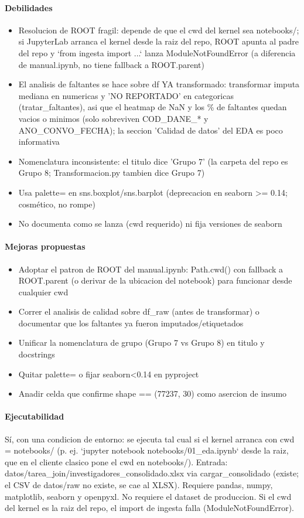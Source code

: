 \paragraph{Debilidades}
\begin{itemize}
  \item Resolucion de ROOT fragil: depende de que el cwd del kernel sea notebooks/; si JupyterLab arranca el kernel desde la raiz del repo, ROOT apunta al padre del repo y `from ingesta import ...` lanza ModuleNotFoundError (a diferencia de manual.ipynb, no tiene fallback a ROOT.parent)
  \item El analisis de faltantes se hace sobre df YA transformado: transformar imputa mediana en numericas y 'NO REPORTADO' en categoricas (tratar\_faltantes), asi que el heatmap de NaN y los \% de faltantes quedan vacios o minimos (solo sobreviven COD\_DANE\_* y ANO\_CONVO\_FECHA); la seccion 'Calidad de datos' del EDA es poco informativa
  \item Nomenclatura inconsistente: el titulo dice 'Grupo 7' (la carpeta del repo es Grupo 8; Transformacion.py tambien dice Grupo 7)
  \item Usa palette= en sns.boxplot/sns.barplot (deprecacion en seaborn >= 0.14; cosmético, no rompe)
  \item No documenta como se lanza (cwd requerido) ni fija versiones de seaborn
\end{itemize}

\paragraph{Mejoras propuestas}
\begin{itemize}
  \item Adoptar el patron de ROOT del manual.ipynb: Path.cwd() con fallback a ROOT.parent (o derivar de la ubicacion del notebook) para funcionar desde cualquier cwd
  \item Correr el analisis de calidad sobre df\_raw (antes de transformar) o documentar que los faltantes ya fueron imputados/etiquetados
  \item Unificar la nomenclatura de grupo (Grupo 7 vs Grupo 8) en titulo y docstrings
  \item Quitar palette= o fijar seaborn<0.14 en pyproject
  \item Anadir celda que confirme shape == (77237, 30) como asercion de insumo
\end{itemize}

\paragraph{Ejecutabilidad}
Sí, con una condicion de entorno: se ejecuta tal cual si el kernel arranca con cwd = notebooks/ (p. ej. `jupyter notebook notebooks/01\_eda.ipynb` desde la raiz, que en el cliente clasico pone el cwd en notebooks/). Entrada: datos/tarea\_join/investigadores\_consolidado.xlsx via cargar\_consolidado (existe; el CSV de datos/raw no existe, se cae al XLSX). Requiere pandas, numpy, matplotlib, seaborn y openpyxl. No requiere el dataset de produccion. Si el cwd del kernel es la raiz del repo, el import de ingesta falla (ModuleNotFoundError).

